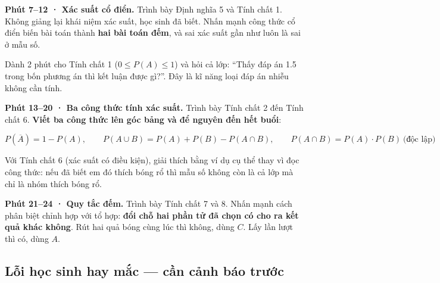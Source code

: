 \documentclass[11pt, a4paper]{article}
\begin{document}
\textbf{Phút 7–12 · Xác suất cổ điển.} Trình bày Định nghĩa 5 và Tính chất 1. Không giảng lại khái niệm xác suất, học sinh đã biết. Nhấn mạnh công thức cổ điển biến bài toán thành \textbf{hai bài toán đếm}, và sai xác suất gần như luôn là sai ở mẫu số.

Dành 2 phút cho Tính chất 1 ($0 \le P(A) \le 1$) và hỏi cả lớp: “Thấy đáp án 1.5 trong bốn phương án thì kết luận được gì?”. Đây là kĩ năng loại đáp án nhiễu không cần tính.

\textbf{Phút 13–20 · Ba công thức tính xác suất.} Trình bày Tính chất 2 đến Tính chất 6. \textbf{Viết ba công thức lên góc bảng và để nguyên đến hết buổi}:

$$P(\overline{A}) = 1 - P(A), \qquad P(A \cup B) = P(A) + P(B) - P(A \cap B), \qquad P(A \cap B) = P(A) \cdot P(B) \ \text{(độc lập)}$$

Với Tính chất 6 (xác suất có điều kiện), giải thích bằng ví dụ cụ thể thay vì đọc công thức: nếu đã biết em đó thích bóng rổ thì mẫu số không còn là cả lớp mà chỉ là nhóm thích bóng rổ.

\textbf{Phút 21–24 · Quy tắc đếm.} Trình bày Tính chất 7 và 8. Nhấn mạnh cách phân biệt chỉnh hợp với tổ hợp: \textbf{đổi chỗ hai phần tử đã chọn có cho ra kết quả khác không}. Rút hai quả bóng cùng lúc thì không, dùng $C$. Lấy lần lượt thì có, dùng $A$.

\subsection{Lỗi học sinh hay mắc — cần cảnh báo trước}

\end{document}
